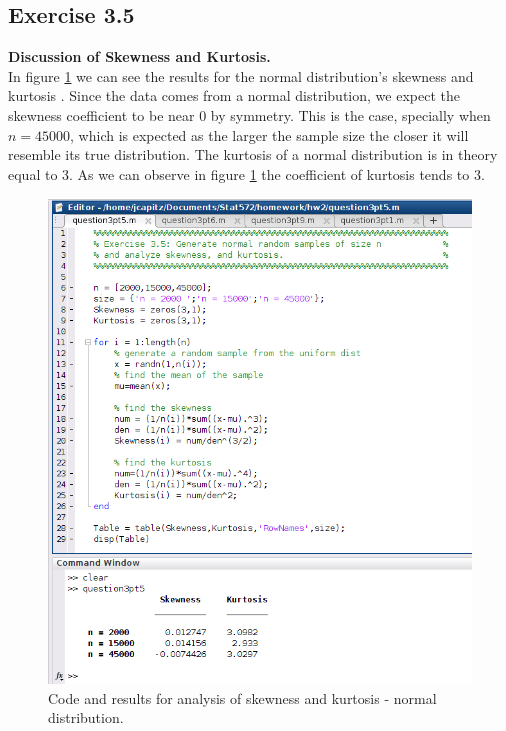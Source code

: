 \documentclass[12pt,a4paper]{article}
\begin{document}
\subsection*{Exercise 3.5}

\textbf{Discussion of Skewness and Kurtosis.}\\

In figure \ref{q3pt5fig1} we can see the results for the normal distribution's skewness and kurtosis . Since the data comes from a normal distribution, we expect the skewness coefficient to be near $0$ by symmetry. This is the case, specially when $n=45000$, which is expected as the larger the sample size the closer it will resemble its true distribution. The kurtosis of a normal distribution is in theory equal to 3. As we can observe in figure \ref{q3pt5fig1} the coefficient of kurtosis tends to 3.

\begin{figure}[ht!]
\begin{center}
\includegraphics[scale=.60]{q3pt5_code.png}
\caption{Code and results for analysis of skewness and kurtosis - normal distribution.}
\label{q3pt5fig1}
\end{center}
\end{figure}
\FloatBarrier
\end{document}
